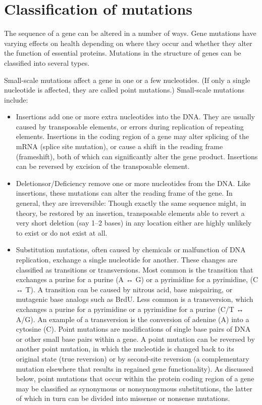 \hypertarget{classification-of-mutations}{%
\section{Classification of mutations}\label{classification-of-mutations}}

The sequence of a gene can be altered in a number of ways. Gene mutations have varying effects on health depending on where they occur and whether they alter the function of essential proteins. Mutations in the structure of genes can be classified into several types.

Small-scale mutations affect a gene in one or a few nucleotides. (If only a single nucleotide is affected, they are called point mutations.) Small-scale mutations include:

\begin{itemize}
\tightlist
\item
  Insertions add one or more extra nucleotides into the DNA. They are usually caused by transposable elements, or errors during replication of repeating elements. Insertions in the coding region of a gene may alter splicing of the mRNA (splice site mutation), or cause a shift in the reading frame (frameshift), both of which can significantly alter the gene product. Insertions can be reversed by excision of the transposable element.
\item
  Deletionsor/Deficiency remove one or more nucleotides from the DNA. Like insertions, these mutations can alter the reading frame of the gene. In general, they are irreversible: Though exactly the same sequence might, in theory, be restored by an insertion, transposable elements able to revert a very short deletion (say 1--2 bases) in any location either are highly unlikely to exist or do not exist at all.
\item
  Substitution mutations, often caused by chemicals or malfunction of DNA replication, exchange a single nucleotide for another. These changes are classified as transitions or transversions. Most common is the transition that exchanges a purine for a purine (A ↔ G) or a pyrimidine for a pyrimidine, (C ↔ T). A transition can be caused by nitrous acid, base mispairing, or mutagenic base analogs such as BrdU. Less common is a transversion, which exchanges a purine for a pyrimidine or a pyrimidine for a purine (C/T ↔ A/G). An example of a transversion is the conversion of adenine (A) into a cytosine (C). Point mutations are modifications of single base pairs of DNA or other small base pairs within a gene. A point mutation can be reversed by another point mutation, in which the nucleotide is changed back to its original state (true reversion) or by second-site reversion (a complementary mutation elsewhere that results in regained gene functionality). As discussed below, point mutations that occur within the protein coding region of a gene may be classified as synonymous or nonsynonymous substitutions, the latter of which in turn can be divided into missense or nonsense mutations.
\end{itemize}

